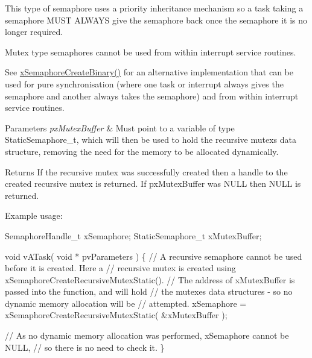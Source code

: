 This type of semaphore uses a priority inheritance mechanism so a task \textquotesingle{}taking\textquotesingle{} a semaphore M\+U\+ST A\+L\+W\+A\+YS \textquotesingle{}give\textquotesingle{} the semaphore back once the semaphore it is no longer required.

Mutex type semaphores cannot be used from within interrupt service routines.

See \hyperlink{vendor_2ceedling_2plugins_2freertos_2src_2freertos_2include_2semphr_8h_acba963695e4f159d9bfa2394cae5badc}{x\+Semaphore\+Create\+Binary()} for an alternative implementation that can be used for pure synchronisation (where one task or interrupt always \textquotesingle{}gives\textquotesingle{} the semaphore and another always \textquotesingle{}takes\textquotesingle{} the semaphore) and from within interrupt service routines.


\begin{DoxyParams}{Parameters}
{\em px\+Mutex\+Buffer} & Must point to a variable of type Static\+Semaphore\+\_\+t, which will then be used to hold the recursive mutex\textquotesingle{}s data structure, removing the need for the memory to be allocated dynamically.\\
\hline
\end{DoxyParams}
\begin{DoxyReturn}{Returns}
If the recursive mutex was successfully created then a handle to the created recursive mutex is returned. If px\+Mutex\+Buffer was N\+U\+LL then N\+U\+LL is returned.
\end{DoxyReturn}
Example usage\+: 
\begin{DoxyPre}
SemaphoreHandle\_t xSemaphore;
StaticSemaphore\_t xMutexBuffer;\end{DoxyPre}



\begin{DoxyPre}void vATask( void * pvParameters )
\{
 // A recursive semaphore cannot be used before it is created.  Here a
 // recursive mutex is created using xSemaphoreCreateRecursiveMutexStatic().
 // The address of xMutexBuffer is passed into the function, and will hold
 // the mutexes data structures - so no dynamic memory allocation will be
 // attempted.
 xSemaphore = xSemaphoreCreateRecursiveMutexStatic( &xMutexBuffer );\end{DoxyPre}



\begin{DoxyPre} // As no dynamic memory allocation was performed, xSemaphore cannot be NULL,
 // so there is no need to check it.
\}
\end{DoxyPre}
 